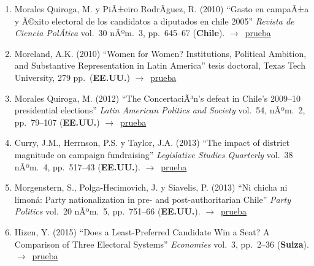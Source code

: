 \documentclass[12 pt, letter]{article}
\newenvironment{CitasMiTrabajo}{
    \begin{footnotesize}
    \begin{enumerate}[label={\footnotesize\emph{cita~\arabic*}},ref=\arabic*] %
        \setlength{\itemsep}{.1\itemsep}
        \setlength{\parskip}{.1\parskip}
    }{\end{enumerate}\end{footnotesize}}
\begin{document}
\begin{CitasMiTrabajo}
        \item Morales Quiroga, M. y PiÃ±eiro RodrÃ­guez, R. (2010)
        ``Gasto en campaÃ±a y Ã©xito electoral de los candidatos a diputados en chile 2005''
        \emph{Revista de Ciencia PolÃ­tica} vol.\ 30 nÃºm.\ 3, pp.\ 645--67 (\textbf{Chile}). $\rightarrow$~\href{http://ericmagar.com/cv/cites/mrs/moralesPineiro2010rcp.pdf}{prueba}

        \item Moreland, A.K. (2010)
        ``Women for Women? Institutions, Political Ambition, and Substantive Representation in Latin America'' tesis doctoral, Texas Tech University, 279 pp.\ (\textbf{EE.UU.}) $\rightarrow$~\href{http://ericmagar.com/cv/cites/mrs/MORELAND-DISSERTATION2010.excerpt.pdf}{prueba}

        \item Morales Quiroga, M. (2012) 
        ``The ConcertaciÃ³n's defeat in Chile's 2009--10 presidential elections''
        \emph{Latin American Politics and Society} vol.\ 54, nÃºm.\ 2, pp.\ 79--107 (\textbf{EE.UU.}) $\rightarrow$~\href{http://ericmagar.com/cv/cites/mrs/morales2012.pdf}{prueba}


        \item Curry, J.M., Herrnson, P.S. y Taylor, J.A. (2013)
        ``The impact of district magnitude on campaign fundraising''
        \emph{Legislative Studies Quarterly} vol.\ 38 nÃºm.\ 4, pp.\ 517--43 (\textbf{EE.UU.}). $\rightarrow$~\href{http://ericmagar.com/cv/cites/mrs/curryEtAl2013lsq.excerpts.pdf}{prueba}

        \item Morgenstern, S., Polga-Hecimovich, J. y Siavelis, P. (2013)
        ``Ni chicha ni limon\'a: Party nationalization in pre- and post-authoritarian Chile''
        \emph{Party Politics} vol.\ 20 nÃºm.\ 5, pp.\ 751--66 (\textbf{EE.UU.}). $\rightarrow$~\href{http://ericmagar.com/cv/cites/mrs/morgenstern.polga.siavelisPtyNatChile2014pp.pdf}{prueba}

        \item Hizen, Y. (2015)
        ``Does a Least-Preferred Candidate Win a Seat? A Comparison of Three Electoral Systems''
        \emph{Economies} vol.\ 3, pp.\ 2--36 (\textbf{Suiza}). $\rightarrow$~\href{http://ericmagar.com/cv/cites/mrs/hizenThreeSystems2015economies.pdf}{prueba}

        \label{ncites:magar.etal.1998} %


\end{CitasMiTrabajo}
\end{document}
